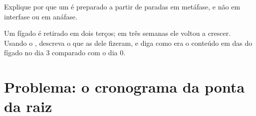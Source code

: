 \begin{exercise}[$\star\star\star$]\label{exo:g11:cell-cycle-mitosis:14}
Explique por que um  é preparado a partir de  paradas
em metáfase, e não em interfase ou em anáfase.
\end{exercise}

\begin{exercise}[$\star\star\star$]\label{exo:g11:cell-cycle-mitosis:15}
Um fígado é retirado em dois terços; em três semanas ele voltou a
crescer. Usando o , descreva o que as  dele
fizeram, e diga como era o conteúdo em  das  do fígado no dia
3 comparado com o dia 0.
\end{exercise}

\section{Problema: o cronograma da ponta da raiz}

